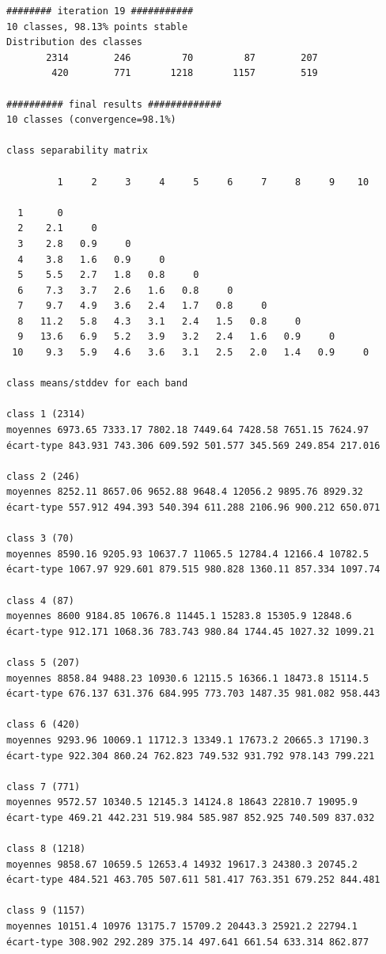 \documentclass[earth,article,submit,pdftex,moreauthors]{Definitions/mdpi}
\begin{document}
{\begin{scriptsize}
\begin{verbatim}
######## iteration 19 ###########
10 classes, 98.13% points stable
Distribution des classes
       2314        246         70         87        207
        420        771       1218       1157        519

########## final results #############
10 classes (convergence=98.1%)

class separability matrix

         1     2     3     4     5     6     7     8     9    10

  1      0
  2    2.1     0
  3    2.8   0.9     0
  4    3.8   1.6   0.9     0
  5    5.5   2.7   1.8   0.8     0
  6    7.3   3.7   2.6   1.6   0.8     0
  7    9.7   4.9   3.6   2.4   1.7   0.8     0
  8   11.2   5.8   4.3   3.1   2.4   1.5   0.8     0
  9   13.6   6.9   5.2   3.9   3.2   2.4   1.6   0.9     0
 10    9.3   5.9   4.6   3.6   3.1   2.5   2.0   1.4   0.9     0

class means/stddev for each band

class 1 (2314)
moyennes 6973.65 7333.17 7802.18 7449.64 7428.58 7651.15 7624.97
écart-type 843.931 743.306 609.592 501.577 345.569 249.854 217.016

class 2 (246)
moyennes 8252.11 8657.06 9652.88 9648.4 12056.2 9895.76 8929.32
écart-type 557.912 494.393 540.394 611.288 2106.96 900.212 650.071

class 3 (70)
moyennes 8590.16 9205.93 10637.7 11065.5 12784.4 12166.4 10782.5
écart-type 1067.97 929.601 879.515 980.828 1360.11 857.334 1097.74

class 4 (87)
moyennes 8600 9184.85 10676.8 11445.1 15283.8 15305.9 12848.6
écart-type 912.171 1068.36 783.743 980.84 1744.45 1027.32 1099.21

class 5 (207)
moyennes 8858.84 9488.23 10930.6 12115.5 16366.1 18473.8 15114.5
écart-type 676.137 631.376 684.995 773.703 1487.35 981.082 958.443

class 6 (420)
moyennes 9293.96 10069.1 11712.3 13349.1 17673.2 20665.3 17190.3
écart-type 922.304 860.24 762.823 749.532 931.792 978.143 799.221

class 7 (771)
moyennes 9572.57 10340.5 12145.3 14124.8 18643 22810.7 19095.9
écart-type 469.21 442.231 519.984 585.987 852.925 740.509 837.032

class 8 (1218)
moyennes 9858.67 10659.5 12653.4 14932 19617.3 24380.3 20745.2
écart-type 484.521 463.705 507.611 581.417 763.351 679.252 844.481

class 9 (1157)
moyennes 10151.4 10976 13175.7 15709.2 20443.3 25921.2 22794.1
écart-type 308.902 292.289 375.14 497.641 661.54 633.314 862.877


\end{verbatim}
\end{scriptsize}}
\end{document}
